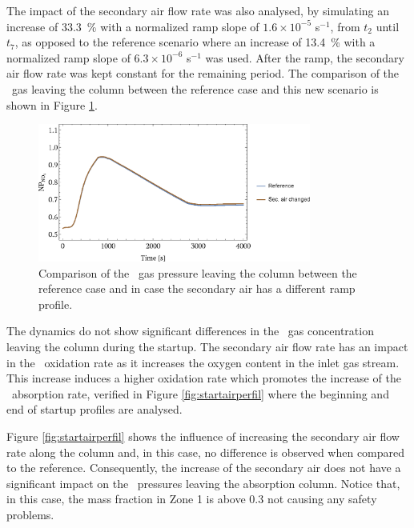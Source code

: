 \documentclass[journal=jacsat,manuscript=article]{achemso}
\newcommand{\nox}{\ce{NO_{\rmfamily{x}}}}
\newcommand{\no}{\ce{NO}}
\begin{document}
The impact of the secondary air flow rate was also analysed, by simulating an increase of \SI{33.3}{\percent} with a normalized ramp slope of $1.6 \times 10^{-5}$ s$^{-1}$, from $t_2$ until $t_7$, as opposed to the reference scenario where an increase of \SI{13.4}{\percent} with a normalized ramp slope of $6.3 \times 10^{-6}$ s$^{-1}$ was used.
After the ramp, the secondary air flow rate was kept constant for the remaining period.
The comparison of the \nox~gas leaving the column between the reference case and this new scenario is shown in Figure \ref{fig:startair}.
\begin{figure}[htb]
	\centering
	\includegraphics[width=0.8\textwidth]{figure5sp.eps}
	\caption{Comparison of the \nox~gas pressure leaving the column between the reference case and in case the secondary air has a different ramp profile.} 	
	\label{fig:startair}
\end{figure}
The dynamics do not show significant differences in the \nox~gas concentration leaving the column during the startup. 
The secondary air flow rate has an impact in the \no~oxidation rate as it increases the oxygen content in the inlet gas stream. This increase induces a higher oxidation rate which promotes the increase of the \nox~absorption rate, verified in Figure \ref{fig:startairperfil} where the beginning and end of startup profiles are analysed.

Figure \ref{fig:startairperfil} shows the influence of increasing the secondary air flow rate along the column and, in this case, no difference is observed when compared to the reference. Consequently, the increase of the secondary air does not have a significant impact on the \nox~pressures leaving the absorption column. Notice that, in this case, the mass fraction in Zone 1 is above 0.3 not causing any safety problems.
\end{document}
